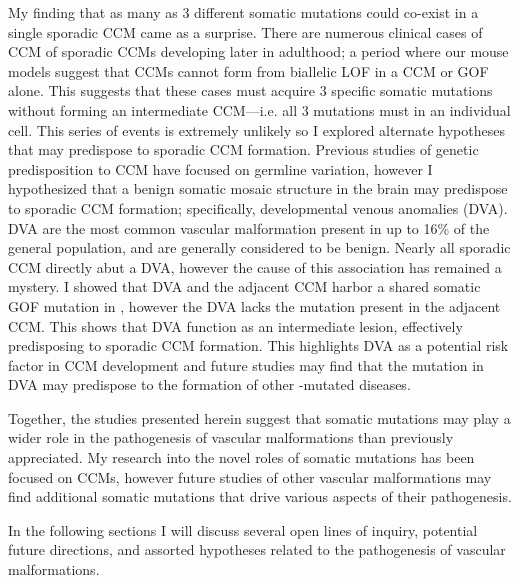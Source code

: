 My finding that as many as 3 different somatic mutations could co-exist in a single sporadic CCM came as a surprise. There are numerous clinical cases of CCM of sporadic CCMs developing later in adulthood; a period where our mouse models suggest that CCMs cannot form from biallelic LOF in a CCM or  GOF alone. This suggests that these cases must acquire 3 specific somatic mutations without forming an intermediate CCM---i.e. all 3 mutations must  in an individual cell. This series of events is extremely unlikely so I explored alternate hypotheses that may predispose to sporadic CCM formation. Previous studies of genetic predisposition to CCM have focused on germline variation, however I hypothesized that a benign somatic mosaic structure in the brain may predispose to sporadic CCM formation; specifically, developmental venous anomalies (DVA). DVA are the most common vascular malformation present in up to 16\% of the general population, and are generally considered to be benign. Nearly all sporadic CCM directly abut a DVA, however the cause of this association has remained a mystery. I showed that DVA and the adjacent CCM harbor a shared somatic GOF mutation in , however the DVA lacks the  mutation present in the adjacent CCM. This shows that DVA function as an intermediate lesion, effectively predisposing to sporadic CCM formation. This highlights DVA as a potential risk factor in CCM development and future studies may find that the  mutation in DVA may predispose to the formation of other -mutated diseases.

Together, the studies presented herein suggest that somatic mutations may play a wider role in the pathogenesis of vascular malformations than previously appreciated. My research into the novel roles of somatic mutations has been focused on CCMs, however future studies of other vascular malformations may find additional somatic mutations that drive various aspects of their pathogenesis. 

In the following sections I will discuss several open lines of inquiry, potential future directions, and assorted hypotheses related to the pathogenesis of vascular malformations. 








